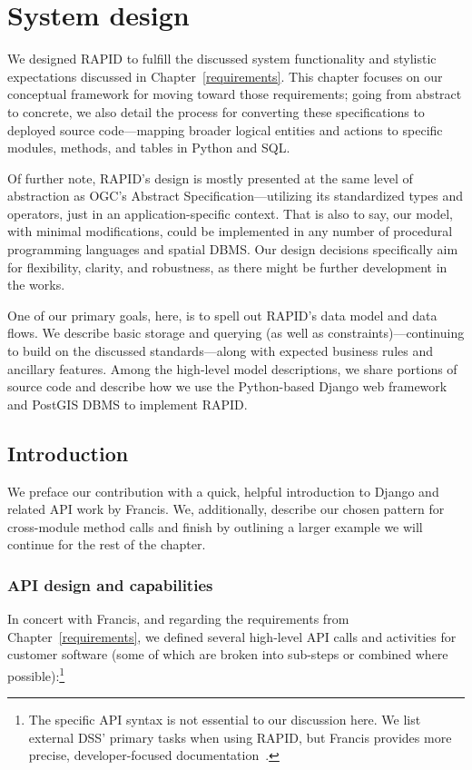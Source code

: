 \chapter{System design}
\label{design}

We designed RAPID to fulfill the discussed system functionality and stylistic expectations discussed in Chapter~\ref{requirements}. This chapter focuses on our conceptual framework for moving toward those requirements; going from abstract to concrete, we also detail the process for converting these specifications to deployed source code---mapping broader logical entities and actions to specific modules, methods, and tables in Python and SQL.

Of further note, RAPID's design is mostly presented at the same level of abstraction as OGC's Abstract Specification---utilizing its standardized types and operators, just in an application-specific context. That is also to say, our model, with minimal modifications, could be implemented in any number of procedural programming languages and spatial DBMS. Our design decisions specifically aim for flexibility, clarity, and robustness, as there might be further development in the works.

One of our primary goals, here, is to spell out RAPID's data model and data flows. We describe basic storage and querying (as well as constraints)---continuing to build on the discussed standards---along with expected business rules and ancillary features. Among the high-level model descriptions, we share portions of source code and describe how we use the Python-based Django web framework and PostGIS DBMS to implement RAPID.


\section{Introduction}
We preface our contribution with a quick, helpful introduction to Django and related API work by Francis. We, additionally, describe our chosen pattern for cross-module method calls and finish by outlining a larger example we will continue for the rest of the chapter.

\subsection{API design and capabilities}
In concert with Francis, and regarding the requirements from Chapter~\ref{requirements}, we defined several high-level API calls and activities for customer software (some of which are broken into sub-steps or combined where possible):\footnote{The specific API syntax is not essential to our discussion here. We list external DSS' primary tasks when using RAPID, but Francis provides more precise, developer-focused documentation~\cite{Francis}.}

